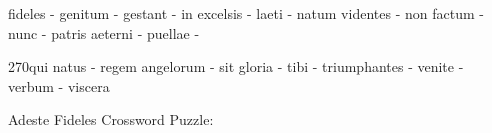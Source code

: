 \documentclass[12pt]{article}
\begin{document}
\pagestyle{fancy}
\fancyhf{}
\renewcommand{\headrulewidth}{0pt} %
  \renewcommand{\footrulewidth}{0pt}
\libertine
\renewcommand\PuzzleClueFont{\rm\normalsize}
\noindent\begin{rotate}{0}\small fideles - genitum - gestant - in excelsis - laeti - natum videntes - non factum - nunc - patris aeterni - puellae - 
\end{rotate}
\hfill
\begin{rotate}{270}\small qui natus - regem angelorum - sit gloria - tibi - triumphantes - venite - verbum - viscera
\end{rotate}
\begin{center}
  \huge{Adeste Fideles Crossword Puzzle:}
\end{center}
\vspace{1.5cm}
\end{document}
